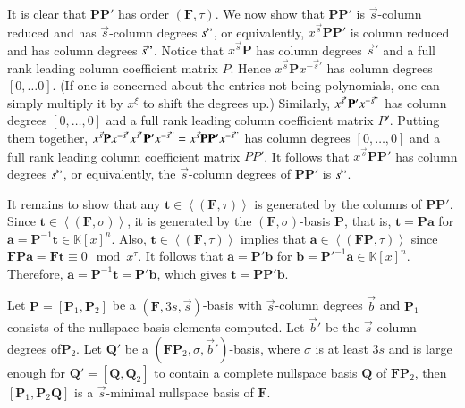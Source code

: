 \begin{pf}
It is clear that $\mathbf{P}\mathbf{P}'$ has order $(\mathbf{F},\tau)$.
We now show that $\mathbf{P}\mathbf{P}'$ is $\vec{s}$-column reduced
and has $\vec{s}$-column degrees $\vec{s}"$, or equivalently, $x^{\vec{s}}\mathbf{P}\mathbf{P}'$
is column reduced and has column degrees $\vec{s}"$. Notice that
$x^{\vec{s}}\mathbf{P}$ has column degrees $\vec{s}'$ and a full
rank leading column coefficient matrix $P$. Hence $x^{\vec{s}}\mathbf{P}x^{-\vec{s}'}$
has column degrees $\left[0,\dots0\right]$. (If one is concerned
about the entries not being polynomials, one can simply multiply it
by $x^{\xi}$ to shift the degrees up.) Similarly, $x^{\vec{s}'}\mathbf{P}'x^{-\vec{s}"}$
has column degrees $[0,\dots,0]$ and a full rank leading column coefficient
matrix $P'$. Putting them together, $x^{\vec{s}}\mathbf{P}x^{-\vec{s}'}x^{\vec{s}'}\mathbf{P}'x^{-\vec{s}"}=x^{\vec{s}}\mathbf{P}\mathbf{P}'x^{-\vec{s}"}$
has column degrees $[0,\dots,0]$ and a full rank leading column coefficient
matrix $PP'$. It follows that $x^{\vec{s}}\mathbf{P}\mathbf{P}'$
has column degrees $\vec{s}"$, or equivalently, the $\vec{s}$-column
degrees of $\mathbf{PP}'$ is $\vec{s}"$.

It remains to show that any $\mathbf{t}\in\left\langle \left(\mathbf{F},\tau\right)\right\rangle $
is generated by the columns of $\mathbf{PP}'$. Since $\mathbf{t}\in\left\langle \left(\mathbf{F},\sigma\right)\right\rangle $,
it is generated by the $\left(\mathbf{F},\sigma\right)$-basis $\mathbf{P}$,
that is, $\mathbf{t}=\mathbf{P}\mathbf{a}$ for $\mathbf{a}=\mathbf{P}^{-1}\mathbf{t}\in\mathbb{K}\left[x\right]^{n}$.
Also, $\mathbf{t}\in\left\langle \left(\mathbf{F},\tau\right)\right\rangle $
implies that $\mathbf{a}\in\left\langle \left(\mathbf{FP},\tau\right)\right\rangle $
since $\mathbf{F}\mathbf{P}\mathbf{a}=\mathbf{F}\mathbf{t}\equiv0\mod x^{\tau}$.
It follows that $\mathbf{a}=\mathbf{P}'\mathbf{b}$ for $\mathbf{b}=\mathbf{P}'^{-1}\mathbf{a}\in\mathbb{K}\left[x\right]^{n}$.
Therefore, $\mathbf{a}=\mathbf{P}^{-1}\mathbf{t}=\mathbf{P}'\mathbf{b}$,
which gives $\mathbf{t}=\mathbf{P}\mathbf{P}'\mathbf{b}$.\end{pf}
\begin{lem}
\label{lem:continueComputingNullspaceBasisByColumns}Let $\mathbf{P}=\left[\mathbf{P}_{1},\mathbf{P}_{2}\right]$
be a $\left(\mathbf{F},3s,\vec{s}\right)$-basis with $\vec{s}$-column
degrees $\vec{b}$ and $\mathbf{P}_{1}$ consists of the nullspace
basis elements computed. Let $\vec{b}'$ be the $\vec{s}$-column
degrees of$\mathbf{P}_{2}$. Let $\mathbf{Q}'$ be a $\left(\mathbf{F}\mathbf{P}_{2},\sigma,\vec{b}'\right)$-basis,
where $\sigma$ is at least $3s$ and is large enough for $\mathbf{Q}'=\left[\mathbf{Q},\mathbf{Q}_{2}\right]$
to contain a complete nullspace basis $\mathbf{Q}$ of $\mathbf{F}\mathbf{P}_{2}$,
then $\left[\mathbf{P}_{1},\mathbf{P}_{2}\mathbf{Q}\right]$ is a
$\vec{s}$-minimal nullspace basis of $\mathbf{F}$.\end{lem}
